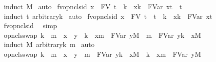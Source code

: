 \begin{isabellebody}
\ {\isacharparenleft}induct\ M{\isacharparenright}\isanewline
{}\isamarkupfalse%
\ auto%
\endisatagproof
{\isafoldproof}%
%
\isadelimproof
\isanewline
%
\endisadelimproof
\isanewline
{}\isamarkupfalse%
\ fv{\isacharunderscore}opn{\isacharunderscore}cls{\isacharunderscore}id{\isacharcolon}\ {\isachardoublequoteopen}x\ {\isasymnotin}\ FV\ t\ {\isasymLongrightarrow}\ {\isacharbraceleft}k\ {\isacharless}{\isacharminus}\ x{\isacharbraceright}{\isacharbraceleft}k\ {\isasymrightarrow}\ FVar\ x{\isacharbraceright}t\ {\isacharequal}\ t{\isachardoublequoteclose}\isanewline
%
\isadelimproof
%
\endisadelimproof
%
\isatagproof
{}\isamarkupfalse%
\ {\isacharparenleft}induct\ t\ arbitrary{\isacharcolon}k{\isacharparenright}\isanewline
{}\isamarkupfalse%
\ auto%
\endisatagproof
{\isafoldproof}%
%
\isadelimproof
\isanewline
%
\endisadelimproof
\isanewline
{}\isamarkupfalse%
\ fv{\isacharunderscore}opn{\isacharunderscore}cls{\isacharunderscore}id{}{\isacharcolon}\ {\isachardoublequoteopen}x\ {\isasymnotin}\ FV\ t\ {\isasymLongrightarrow}\ t\ {\isacharequal}\ {\isacharbraceleft}k\ {\isacharless}{\isacharminus}\ x{\isacharbraceright}{\isacharbraceleft}k\ {\isasymrightarrow}\ FVar\ x{\isacharbraceright}t{\isachardoublequoteclose}\ \isanewline
%
\isadelimproof
%
\endisadelimproof
%
\isatagproof
{}\isamarkupfalse%
\ fv{\isacharunderscore}opn{\isacharunderscore}cls{\isacharunderscore}id\ \isamarkupfalse%
\ simp%
\endisatagproof
{\isafoldproof}%
%
\isadelimproof
\isanewline
%
\endisadelimproof
\isanewline
{}\isamarkupfalse%
\ opn{\isacharunderscore}cls{\isacharunderscore}swap{\isacharcolon}\ {\isachardoublequoteopen}k\ {\isasymnoteq}\ m\ {\isasymLongrightarrow}\ x\ {\isasymnoteq}\ y\ {\isasymLongrightarrow}\ {\isacharbraceleft}k\ {\isacharless}{\isacharminus}\ x{\isacharbraceright}{\isacharbraceleft}m\ {\isasymrightarrow}\ FVar\ y{\isacharbraceright}M\ {\isacharequal}\ {\isacharbraceleft}m\ {\isasymrightarrow}\ FVar\ y{\isacharbraceright}{\isacharbraceleft}k\ {\isacharless}{\isacharminus}\ x{\isacharbraceright}M{\isachardoublequoteclose}\isanewline
%
\isadelimproof
%
\endisadelimproof
%
\isatagproof
{}\isamarkupfalse%
\ {\isacharparenleft}induct\ M\ arbitrary{\isacharcolon}k\ m{\isacharparenright}\isanewline
{}\isamarkupfalse%
\ auto%
\endisatagproof
{\isafoldproof}%
%
\isadelimproof
\isanewline
%
\endisadelimproof
\isanewline
{}\isamarkupfalse%
\ opn{\isacharunderscore}cls{\isacharunderscore}swap{}{\isacharcolon}\ {\isachardoublequoteopen}k\ {\isasymnoteq}\ m\ {\isasymLongrightarrow}\ x\ {\isasymnoteq}\ y\ {\isasymLongrightarrow}\ {\isacharbraceleft}m\ {\isasymrightarrow}\ FVar\ y{\isacharbraceright}{\isacharbraceleft}k\ {\isacharless}{\isacharminus}\ x{\isacharbraceright}M\ {\isacharequal}\ {\isacharbraceleft}k\ {\isacharless}{\isacharminus}\ x{\isacharbraceright}{\isacharbraceleft}m\ {\isasymrightarrow}\ FVar\ y{\isacharbraceright}M{\isachardoublequoteclose}\isanewline

\end{isabellebody}
